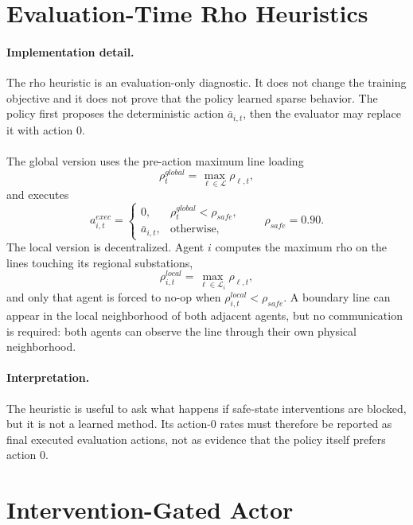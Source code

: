 \section{Evaluation-Time Rho Heuristics}
\label{subsec:sparse-control-heuristics}

\paragraph{Implementation detail.}
The rho heuristic is an evaluation-only diagnostic. It does not change the
training objective and it does not prove that the policy learned sparse
behavior. The policy first proposes the deterministic action \(\bar a_{i,t}\),
then the evaluator may replace it with action \(0\).
\\
\\
The global version uses the pre-action maximum line loading
\[
  \rho_t^{global}=\max_{\ell\in\mathcal L}\rho_{\ell,t},
\]
and executes
\[
  a_{i,t}^{exec}=
  \begin{cases}
    0, & \rho_t^{global}<\rho_{safe},\\
    \bar a_{i,t}, & \text{otherwise,}
  \end{cases}
  \qquad \rho_{safe}=0.90.
\]
The local version is decentralized. Agent \(i\) computes the maximum rho on the
lines touching its regional substations,
\[
  \rho_{i,t}^{local}=\max_{\ell\in\mathcal L_i}\rho_{\ell,t},
\]
and only that agent is forced to no-op when
\(\rho_{i,t}^{local}<\rho_{safe}\). A boundary line can appear in the local
neighborhood of both adjacent agents, but no communication is required: both
agents can observe the line through their own physical neighborhood.

\paragraph{Interpretation.}
The heuristic is useful to ask what happens if safe-state interventions are
blocked, but it is not a learned method. Its action-0 rates must therefore be
reported as final executed evaluation actions, not as evidence that the policy
itself prefers action \(0\).

\section{Intervention-Gated Actor}
\label{subsec:sparse-control-gate}

